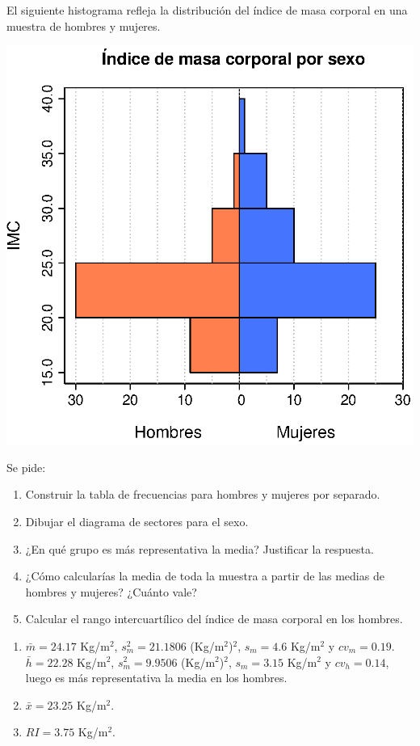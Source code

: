 {El siguiente histograma refleja la distribución del índice de masa corporal en una muestra de hombres y mujeres.
\begin{center}
\includegraphics[scale=0.7]{img/histograma-des-29}
\end{center}
Se pide:
\begin{enumerate}
\item Construir la tabla de frecuencias para hombres y mujeres por separado.
\item Dibujar el diagrama de sectores para el sexo.
\item ¿En qué grupo es más representativa la media? Justificar la respuesta.
\item ¿Cómo calcularías la media de toda la muestra a partir de las medias de hombres y mujeres? ¿Cuánto vale?
\item Calcular el rango intercuartílico del índice de masa corporal en los hombres.
\end{enumerate}
}
{\begin{enumerate}[start=3]
\item $\bar{m} =24.17$ Kg/m$^2$, $s_{m}^2=21.1806$ (Kg/m$^2$)$^2$, $s_m=4.6$ Kg/m$^2$ y $cv_m = 0.19$.\\
$\bar{h} =22.28$ Kg/m$^2$, $s_{m}^2=9.9506$ (Kg/m$^2$)$^2$, $s_m=3.15$ Kg/m$^2$ y $cv_h = 0.14$, luego es más representativa la media en los
hombres.
\item $\bar{x}=23.25$ Kg/m$^2$.
\item $RI=3.75$ Kg/m$^2$.
\end{enumerate}
}

